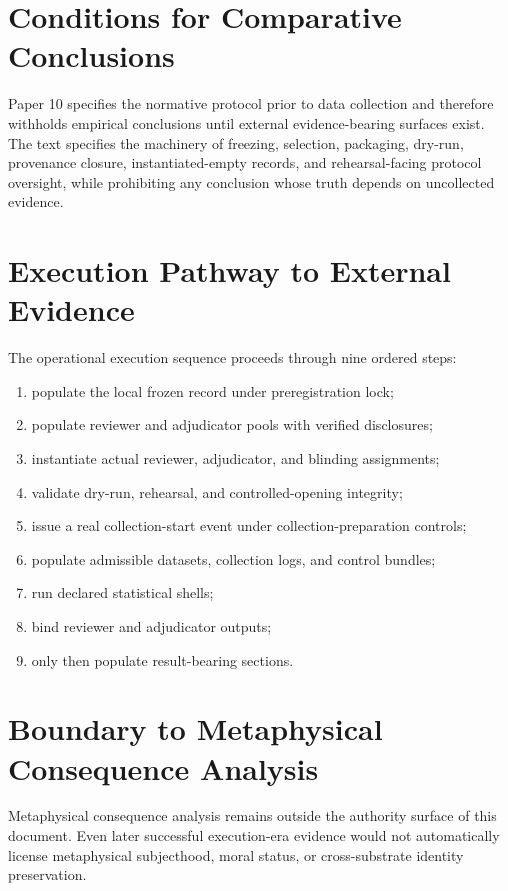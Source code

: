 \documentclass[11pt,a4paper]{article}
\begin{document}
\section{Conditions for Comparative Conclusions}

Paper 10 specifies the normative protocol prior to data collection and therefore
withholds empirical conclusions until external evidence-bearing surfaces exist.
The text specifies the machinery of freezing, selection, packaging, dry-run,
provenance closure, instantiated-empty records, and rehearsal-facing protocol oversight,
while prohibiting any conclusion whose truth depends on uncollected evidence.

\section{Execution Pathway to External Evidence}

The operational execution sequence proceeds through nine ordered steps:

\begin{enumerate}
\item populate the local frozen record under preregistration lock;
\item populate reviewer and adjudicator pools with verified disclosures;
\item instantiate actual reviewer, adjudicator, and blinding assignments;
\item validate dry-run, rehearsal, and controlled-opening integrity;
\item issue a real collection-start event under collection-preparation controls;
\item populate admissible datasets, collection logs, and control bundles;
\item run declared statistical shells;
\item bind reviewer and adjudicator outputs;
\item only then populate result-bearing sections.
\end{enumerate}

\section{Boundary to Metaphysical Consequence Analysis}

Metaphysical consequence analysis remains outside the authority surface of this
document. Even later successful execution-era evidence would not
automatically license metaphysical subjecthood, moral status, or
cross-substrate identity preservation.
\end{document}
